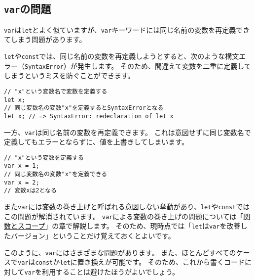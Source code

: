 \hypertarget{var-issues}{%
\subsection{\texorpdfstring{\texttt{var}の問題}{varの問題}}\label{var-issues}}

\texttt{var}は\texttt{let}とよく似ていますが、\texttt{var}キーワードには同じ名前の変数を再定義できてしまう問題があります。

\texttt{let}や\texttt{const}では、同じ名前の変数を再定義しようとすると、次のような構文エラー（\texttt{SyntaxError}）が発生します。
そのため、間違えて変数を二重に定義してしまうというミスを防ぐことができます。

\begin{lstlisting}
// "x"という変数名で変数を定義する
let x;
// 同じ変数名の変数"x"を定義するとSyntaxErrorとなる
let x; // => SyntaxError: redeclaration of let x
\end{lstlisting}

一方、\texttt{var}は同じ名前の変数を再定義できます。
これは意図せずに同じ変数名で定義してもエラーとならずに、値を上書きしてしまいます。

\begin{lstlisting}
// "x"という変数を定義する
var x = 1;
// 同じ変数名の変数"x"を定義できる
var x = 2;
// 変数xは2となる
\end{lstlisting}

また\texttt{var}には変数の巻き上げと呼ばれる意図しない挙動があり、\texttt{let}や\texttt{const}ではこの問題が解消されています。
\texttt{var}による変数の巻き上げの問題については「\hyperlink{function-and-scope}{関数とスコープ}」の章で解説します。
そのため、現時点では「\texttt{let}は\texttt{var}を改善したバージョン」ということだけ覚えておくとよいです。

このように、\texttt{var}にはさまざまな問題があります。
また、ほとんどすべてのケースで\texttt{var}は\texttt{const}か\texttt{let}に置き換えが可能です。
そのため、これから書くコードに対して\texttt{var}を利用することは避けたほうがよいでしょう。

